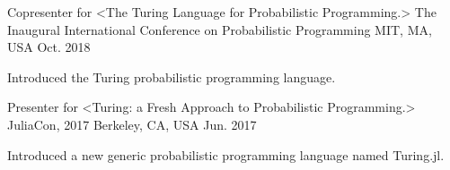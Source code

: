 

\begin{cventries}

  \cventry
    {Copresenter for <The Turing Language for Probabilistic Programming.>} %
    {The Inaugural International Conference on Probabilistic Programming} %
    {MIT, MA, USA} %
    {Oct. 2018} %
    {
      \begin{cvitems} %
        \item {Introduced the Turing probabilistic programming language.}
      \end{cvitems}
    }
 
  \cventry
    {Presenter for <Turing: a Fresh Approach to Probabilistic Programming.>} %
    {JuliaCon, 2017} %
    {Berkeley, CA, USA} %
    {Jun. 2017} %
    {
      \begin{cvitems} %
        \item {Introduced a new generic probabilistic programming language named Turing.jl.}
      \end{cvitems}
    }


\end{cventries}
